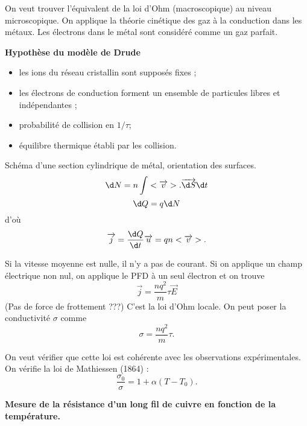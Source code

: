 On veut trouver l'équivalent de la loi d'Ohm (macroscopique) au niveau microscopique.
On applique la théorie cinétique des gaz à la conduction dans les métaux.
Les électrons dans le métal sont considéré comme un gaz parfait.
\begin{slide}
\textbf{Hypothèse du modèle de Drude}
\begin{itemize}
\item les ions du réseau cristallin sont supposés fixes ;
\item les électrons de conduction forment un ensemble de particules libres et indépendantes ;
\item probabilité de collision en $1/\tau$;
\item équilibre thermique établi par les collision.
\end{itemize}
\end{slide}

Schéma d'une section cylindrique de métal, orientation des surfaces.
\begin{equation}
\d N = n\int<\overrightarrow{v}>.\overrightarrow{\d S} \d t
\end{equation}
\begin{equation}
\d Q = q\d N
\end{equation}
d'où
\begin{equation}
\overrightarrow{j} = \frac{\d Q}{\d t} \overrightarrow{u} = qn<\overrightarrow{v}>.
\end{equation}

Si la vitesse moyenne est nulle, il n'y a pas de courant.
Si on applique un champ électrique non  nul, on applique le PFD à un seul électron et on trouve
\begin{equation}
\overrightarrow{j} = \frac{n q^2}{m} \tau \overrightarrow{E}
\end{equation}
(Pas de force de frottement ???)
C'est la loi d'Ohm locale.
On peut poser la conductivité $\sigma$ comme 
\begin{equation}
\sigma = \frac{n q^2}{m} \tau.
\end{equation}

On veut vérifier que cette loi est cohérente avec les observations expérimentales.
On vérifie la loi de Mathiessen (1864) :
\begin{equation}
\frac{\sigma_0}{\sigma} = 1 + \alpha (T-T_0).
\end{equation}

\begin{experience}
\textbf{Mesure de la résistance d'un long fil de cuivre en fonction de la température.}
\end{experience}

